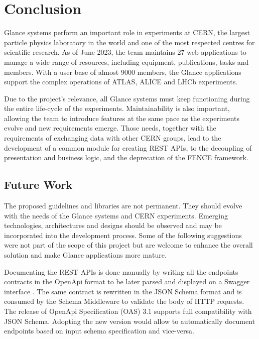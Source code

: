 \chapter{Conclusion}
\label{chap7}

Glance systems perform an important role in experiments at CERN, the largest particle physics laboratory in the world and one of the most respected centres for scientific research. As of June 2023, the team maintains 27 web applications to manage a wide range of resources, including equipment, publications, tasks and members. With a user base of almost 9000 members, the Glance applications support the complex operations of ATLAS, ALICE and LHCb experiments.

Due to the project's relevance, all Glance systems must keep functioning during the entire life-cycle of the experiments. Maintainability is also important, allowing the team to introduce features at the same pace as the experiments evolve and new requirements emerge. Those needs, together with the requirements of exchanging data with other CERN groups, lead to the development of a common module for creating REST APIs, to the decoupling of presentation and business logic, and the deprecation of the FENCE framework.


\section{Future Work}

The proposed guidelines and libraries are not permanent. They should evolve with the needs of the Glance systems and CERN experiments. Emerging technologies, architectures and designs should be observed and may be incorporated into the development process. Some of the following suggestions were not part of the scope of this project but are welcome to enhance the overall solution and make Glance applications more mature.

Documenting the REST APIs is done manually by writing all the endpoints contracts in the OpenApi \cite{open-api} format to be later parsed and displayed on a Swagger interface \cite{swagger-ui}. The same contract is rewritten in the JSON Schema \cite{json-schema-spec} format and is consumed by the Schema Middleware \cite{schema-middleware} to validate the body of HTTP requests. The release of OpenApi Specification (OAS) 3.1 \cite{oas-3.1} supports full compatibility with JSON Schema. Adopting the new version would allow to automatically document endpoints based on input schema specification and vice-versa.

